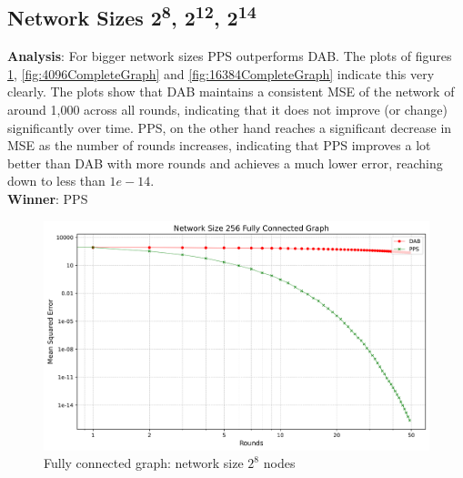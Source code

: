 \subsection{Network Sizes 2\textsuperscript{8}, 2\textsuperscript{12}, 2\textsuperscript{14}}
\textbf{Analysis}: For bigger network sizes PPS outperforms DAB. The plots of figures \ref{fig:256CompleteGraph}, \ref{fig:4096CompleteGraph} and \ref{fig:16384CompleteGraph} indicate this very clearly. The plots show that DAB maintains a consistent MSE of the network of around 1,000 across all rounds, indicating that it does not improve (or change) significantly over time. PPS, on the other hand reaches a significant decrease in MSE as the number of rounds increases, indicating that PPS improves a lot better than DAB with more rounds and achieves a much lower error, reaching down to less than $1e-14$.\\
\textbf{Winner}: PPS
\begin{figure}[H]
    \centering
    \includegraphics[scale=0.5]{figures/completeGraphSimulations/DAB_vs_PPS_FCG_r50_n256.png}
    \caption{Fully connected graph: network size $2^{8}$ nodes}
    \label{fig:256CompleteGraph}
\end{figure}

